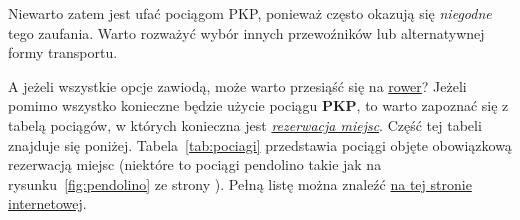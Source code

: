 Niewarto zatem jest ufać pociągom PKP, ponieważ często okazują się \emph{niegodne} tego zaufania. Warto rozważyć wybór innych przewoźników lub alternatywnej formy transportu.\par
A jeżeli wszystkie opcje zawiodą, może warto przesiąść się na \underline{rower}? Jeżeli pomimo wszystko konieczne będzie użycie pociągu \textbf{PKP}, to warto zapoznać się z tabelą pociągów, w których konieczna jest \underline{\textit{rezerwacja miejsc}}. Część tej tabeli znajduje się poniżej. Tabela~\ref{tab:pociagi} przedstawia pociągi objęte obowiązkową rezerwacją miejsc (niektóre to pociągi pendolino takie jak na rysunku~\ref{fig:pendolino} ze strony \pageref{fig:pendolino}). Pełną listę można znaleźć \href{https://www.intercity.pl/pl/site/o-nas/dzial-prasowy/komunikaty/lista-pociagow-objetych-obowiazkowa-rezerwacja-miejsc.html}{na tej stronie internetowej}.


